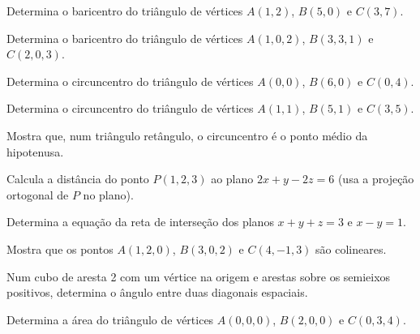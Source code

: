 \documentclass[12pt]{article}
\begin{document}
\begin{exercicios}
  \item Determina o baricentro do triângulo de vértices $A(1, 2)$, $B(5, 0)$ e $C(3, 7)$.
  \item Determina o baricentro do triângulo de vértices $A(1, 0, 2)$, $B(3, 3, 1)$ e $C(2, 0, 3)$.
  \item Determina o circuncentro do triângulo de vértices $A(0, 0)$, $B(6, 0)$ e $C(0, 4)$.
  \item Determina o circuncentro do triângulo de vértices $A(1, 1)$, $B(5, 1)$ e $C(3, 5)$.
  \item Mostra que, num triângulo retângulo, o circuncentro é o ponto médio da hipotenusa.
\end{exercicios}

\begin{exercicios}
  \item Calcula a distância do ponto $P(1, 2, 3)$ ao plano $2x + y - 2z = 6$ (usa a projeção ortogonal de $P$ no plano).
  \item Determina a equação da reta de interseção dos planos $x + y + z = 3$ e $x - y = 1$.
  \item Mostra que os pontos $A(1, 2, 0)$, $B(3, 0, 2)$ e $C(4, -1, 3)$ são colineares.
  \item Num cubo de aresta 2 com um vértice na origem e arestas sobre os semieixos positivos, determina o ângulo entre duas diagonais espaciais.
  \item Determina a área do triângulo de vértices $A(0,0,0)$, $B(2,0,0)$ e $C(0,3,4)$.
\end{exercicios}
\end{document}
